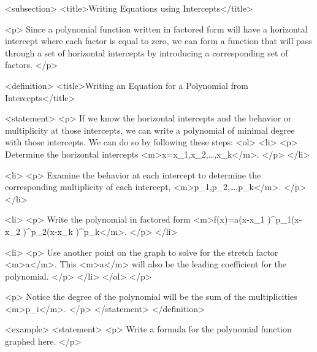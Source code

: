     <subsection>
        <title>Writing Equations using Intercepts</title>

        <p>
            Since a polynomial function written in factored form will have a horizontal intercept where each factor is equal to zero, we can form a function that will pass through a set of horizontal intercepts by introducing a corresponding set of factors.
        </p>

        <definition>
            <title>Writing an Equation for a Polynomial from Intercepts</title>

            <statement>
                <p>
                    If we know the horizontal intercepts and the behavior or multiplicity at those intercepts, we can write a polynomial of minimal degree with those intercepts.
                    We can do so by following these steps:
                    <ol>
                        <li>
                            <p>
                                Determine the horizontal intercepts <m>x=x_{1},x_{2},\dots,x_{k}</m>.
                            </p>
                        </li>

                        <li>
                            <p>
                                Examine the behavior at each intercept to determine the corresponding multiplicity of each intercept, <m>p_{1},p_{2},\dots,p_{k}</m>.
                            </p>
                        </li>

                        <li>
                            <p>
                                Write the polynomial in factored form <m>f(x)=a(x-x_{1} )^{p_1}(x-x_{2} )^{p_2}\cdots(x-x_{k} )^{p_k}</m>.
                            </p>
                        </li>

                        <li>
                            <p>
                                Use another point on the graph to solve for the stretch factor <m>a</m>.
                                This <m>a</m> will also be the leading coefficient for the polynomial.
                            </p>
                        </li>
                    </ol>
                </p>

                <p>
                    Notice the degree of the polynomial will be the sum of the multiplicities <m>p_{i}</m>.
                </p>
            </statement>
        </definition>

        <example>
            <statement>
                <p>
                    Write a formula for the polynomial function graphed here.
                </p>

